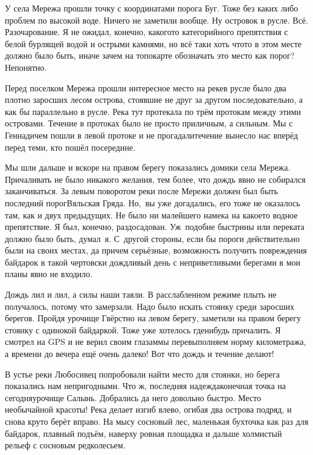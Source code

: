 У села Мережа прошли точку с координатами порога Буг. Тоже без каких либо проблем по высокой воде. Ничего не заметили вообще. Ну островок в русле. Всё. Разочарование. Я не ожидал, конечно, какого\sdash то категорийного препятствия с белой бурлящей водой и острыми камнями, но всё таки хоть что\sdash то в этом месте должно было быть, иначе зачем на топокарте обозначать это место как порог? Непонятно. 

Перед поселком Мережа прошли интересное место на реке\mdash в русле было два плотно заросших лесом острова, стоявшие не друг за другом последовательно, а как бы параллельно в русле. Река тут протекала по трём протокам между этими островами. Течение в протоках было не просто приличным, а сильным. Мы с Геннадичем пошли в левой протоке и не прогадали\mdash течение вынесло нас вперёд перед теми, кто пошёл посередине.

Мы шли дальше и вскоре на правом берегу показались домики села Мережа. Причаливать не было никакого желания, тем более, что дождь явно не собирался заканчиваться. За левым поворотом реки после Мережи должен был быть последний порог\mdash Вяльская Гряда. Но,~вы уже догадались, его тоже не оказалось там, как и двух предыдущих. Не было ни малейшего намека на какое\sdash то водное препятствие. Я был, конечно, раздосадован. Уж~подобие быстрины или переката должно было быть, думал~я. С~другой стороны, если бы пороги действительно были на своих местах, да причем серьёзные, возможность получить повреждения байдарок в такой чертовски дождливый день с неприветливыми берегами в мои планы явно не входило.

Дождь лил и лил, а силы наши таяли. В расслабленном режиме плыть не получалось, потому что замерзали. Надо было искать стоянку среди заросших берегов. Пройдя урочище Гвёрстно на левом берегу, заметили на правом берегу стоянку с одинокой байдаркой. Тоже уже хотелось где\sdash нибудь причалить. Я смотрел на GPS и не верил своим глазам\mdash мы перевыполняем норму километража, а времени до вечера ещё очень далеко! Вот что дождь и течение делают! 

В устье реки Любосивец попробовали найти место для стоянки, но берега показались нам непригодными. Что ж, последняя надежда\mdash конечная точка на сегодня\mdash урочище Салынь. Добрались да него довольно быстро. Место необычайной красоты! Река делает изгиб влево, огибая два острова подряд, и снова круто берёт вправо. На мысу сосновый лес, маленькая бухточка как раз для байдарок, плавный подъём, наверху ровная площадка и дальше холмистый рельеф с сосновым редколесьем. 

